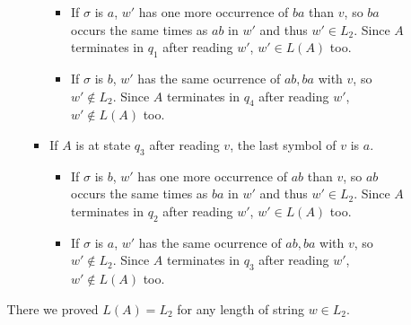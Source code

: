 \documentclass[paper=a4, fontsize=11pt]{scrartcl}
\begin{document}
\begin{enumerate}
\begin{enumerate}
\begin{itemize}
\begin{itemize}
		\begin{itemize}
			\item If $\sigma$ is $a$, $w'$ has one more occurrence of $ba$ than $v$, so $ba$ occurs the same times as $ab$ in $w'$ and thus $w'\in L_2$. Since $A$ terminates in $q_1$ after reading $w'$, $w'\in L(A)$ too.
			\item If $\sigma$ is $b$, $w'$ has the same ocurrence of $ab, ba$ with $v$, so $w'\notin L_2$. Since $A$ terminates in $q_4$ after reading $w'$, $w' \notin L(A)$ too.
		\end{itemize}
		\item If $A$ is at state $q_3$ after reading $v$, the last symbol of $v$ is $a$. 
		\begin{itemize}
			\item If $\sigma$ is $b$, $w'$ has one more occurrence of $ab$ than $v$, so $ab$ occurs the same times as $ba$ in $w'$ and thus $w'\in L_2$. Since $A$ terminates in $q_2$ after reading $w'$, $w'\in L(A)$ too.
			\item If $\sigma$ is $a$, $w'$ has the same ocurrence of $ab, ba$ with $v$, so $w'\notin L_2$. Since $A$ terminates in $q_3$ after reading $w'$, $w' \notin L(A)$ too.
		\end{itemize}
	\end{itemize}
\end{itemize}
There we proved $L(A)=L_2$ for any length of string $w \in L_2$.

\end{enumerate}
\end{enumerate}
\label{lastpage}
\end{document}
